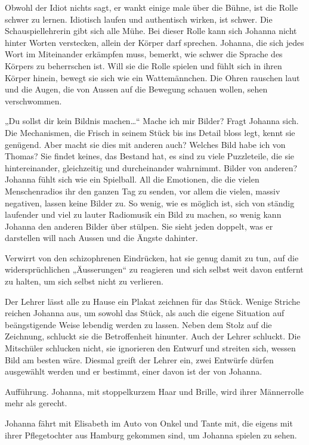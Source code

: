 \documentclass[10pt,titlepage,a5paper]{book}
\begin{document}
Obwohl der Idiot nichts sagt, er wankt einige male über die Bühne, ist die Rolle schwer zu lernen. Idiotisch laufen und authentisch wirken, ist schwer. Die Schauspiellehrerin gibt sich alle Mühe. Bei dieser Rolle kann sich Johanna nicht hinter Worten verstecken, allein der Körper darf sprechen. Johanna, die sich jedes Wort im Miteinander erkämpfen muss, bemerkt, wie schwer die Sprache des Körpers zu beherrschen ist. Will sie die Rolle spielen und fühlt sich in ihren Körper hinein, bewegt sie sich wie ein Wattemännchen. Die Ohren rauschen laut und die Augen, die von Aussen auf die Bewegung schauen wollen, sehen verschwommen. 


„Du sollst dir kein Bildnis machen\dots “ Mache ich mir Bilder? Fragt Johanna sich. Die Mechanismen, die Frisch in seinem Stück bis ins Detail bloss legt, kennt sie genügend. Aber macht sie dies mit anderen auch? Welches Bild habe ich von Thomas? Sie findet keines, das Bestand hat, es sind zu viele Puzzleteile, die sie hintereinander, gleichzeitig und durcheinander wahrnimmt. Bilder von anderen? Johanna fühlt sich wie ein Spielball. All die Emotionen, die die vielen Menschenradios ihr den ganzen Tag zu senden, vor allem die vielen, massiv negativen, lassen keine Bilder zu. So wenig, wie es möglich ist, sich von ständig laufender und viel zu lauter Radiomusik ein Bild zu machen, so wenig kann Johanna den anderen Bilder über stülpen. Sie sieht jeden doppelt, was er darstellen will nach Aussen und die Ängste dahinter. 

Verwirrt von den schizophrenen Eindrücken, hat sie genug damit zu tun, auf die widersprüchlichen „Äusserungen“ zu reagieren und sich selbst weit davon entfernt zu halten, um sich selbst nicht zu verlieren.

Der Lehrer lässt alle zu Hause ein Plakat zeichnen für das Stück. Wenige Striche reichen Johanna aus, um sowohl das Stück, als auch die eigene Situation auf beängstigende Weise lebendig werden zu lassen. Neben dem Stolz auf die Zeichnung, schluckt sie die Betroffenheit hinunter. Auch der Lehrer schluckt. Die Mitschüler schlucken nicht, sie ignorieren den Entwurf und streiten sich, wessen Bild am besten wäre. Diesmal greift der Lehrer ein, zwei Entwürfe dürfen ausgewählt werden und er bestimmt, einer davon ist der von Johanna.

Aufführung. Johanna, mit stoppelkurzem Haar und Brille, wird ihrer Männerrolle mehr als gerecht. 

Johanna fährt mit Elisabeth im Auto von Onkel und Tante mit, die eigens mit ihrer Pflegetochter aus Hamburg gekommen sind, um Johanna spielen zu sehen. 
\end{document}
